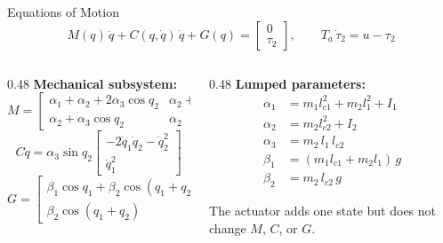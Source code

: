 \documentclass[aspectratio=169, 12pt]{beamer}
\begin{document}


\begin{frame}{Equations of Motion}
\small
\[
  M(q)\,\ddot{q} + C(q,\dot{q})\,\dot{q} + G(q)
  = \begin{bmatrix} 0 \\ \tau_2 \end{bmatrix},
  \qquad
  T_a\,\dot{\tau}_2 = u - \tau_2
\]

\begin{columns}[T]
\begin{column}{0.48\textwidth}
  \textbf{Mechanical subsystem:}
  {\footnotesize
  \[
    M = \begin{bmatrix}
      \alpha_1 + \alpha_2 + 2\alpha_3 \cos q_2
        & \alpha_2 + \alpha_3 \cos q_2 \\
      \alpha_2 + \alpha_3 \cos q_2
        & \alpha_2
    \end{bmatrix}
  \]
  \[
    C\dot{q} = \alpha_3 \sin q_2
    \begin{bmatrix}
      -2\dot{q}_1 \dot{q}_2 - \dot{q}_2^2 \\
      \dot{q}_1^2
    \end{bmatrix}
  \]
  \[
    G = \begin{bmatrix}
      \beta_1 \cos q_1 + \beta_2 \cos(q_1{+}q_2) \\
      \beta_2 \cos(q_1{+}q_2)
    \end{bmatrix}
  \]
  }
\end{column}
\begin{column}{0.48\textwidth}
  \textbf{Lumped parameters:}
  {\footnotesize
  \begin{align*}
    \alpha_1 &= m_1 l_{c1}^2 + m_2 l_1^2 + I_1 \\
    \alpha_2 &= m_2 l_{c2}^2 + I_2 \\
    \alpha_3 &= m_2\, l_1\, l_{c2} \\[6pt]
    \beta_1  &= (m_1 l_{c1} + m_2 l_1)\,g \\
    \beta_2  &= m_2\, l_{c2}\, g
  \end{align*}
  }

  \smallskip
  The actuator adds one state but does not change $M$, $C$, or $G$.
\end{column}
\end{columns}
\end{frame}
\end{document}
